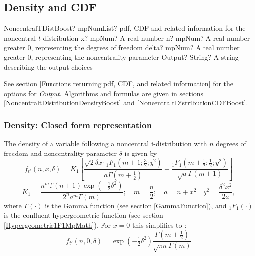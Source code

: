 \subsection{Density and CDF}

\begin{mpFunctionsExtract}
	\mpFunctionFourNotImplemented
	{NoncentralTDistBoost? mpNumList? pdf, CDF and related information for the noncentral $t$-distribution}
	{x? mpNum? A real number}
	{n? mpNum? A real number greater 0, representing the degrees of freedom}
	{delta? mpNum? A real number greater 0, representing the noncentrality parameter}
	{Output? String? A string describing the output choices}
\end{mpFunctionsExtract}


\vspace{0.3cm}
See section \ref{Functions returning pdf, CDF, and related information} for the options for {\itshape\sffamily Output}. Algorithms and formulas are given in sections \ref{NoncentraltDistributionDensityBoost} and \ref{NoncentraltDistributionCDFBoost}.



\label{NoncentraltDistributionDensityBoost}




\subsubsection{Density: Closed form representation}
The density of a variable following a noncentral  t-distribution with $n$ degrees of freedom and noncentrality parameter $\delta$ is given by \citep{Wang1993}
\begin{equation}
f_{t'}(n,x, \delta) = K_1 \left[ \frac{\sqrt{2} \delta x \cdot {}_1F_1(m+1;\tfrac{3}{2};y^2)}{a \Gamma(m+\tfrac{1}{2})}  -   \frac{ {}_1F_1(m+\tfrac{1}{2}; \tfrac{1}{2};y^2)}{\sqrt{a} \Gamma(m+1)}     \right]
\end{equation}
\begin{equation}
K_1 = \frac{n^m \Gamma(n+1) \exp(-\tfrac{1}{2}\delta^2)}{2^n a^m\Gamma(m)}; 
\quad m = \frac{n}{2};
\quad a = n+x^2
\quad y^2 = \frac{\delta^2x^2}{2a},
\end{equation}
where $\Gamma(\cdot)$ is the Gamma function (see section \ref{GammaFunction}), and ${}_1F_1(\cdot)$ is the confluent hypergeometric function (see section \ref{Hypergeometric1F1MpMath}). For $x=0$ this simplifies to \citep{Witkovsky_2013}:
\begin{equation}
f_{t'}(n, 0, \delta) = \exp(-\tfrac{1}{2}\delta^2) \frac{\Gamma(m+\tfrac{1}{2})}{\sqrt{\pi n}\Gamma(m)}
\end{equation}




